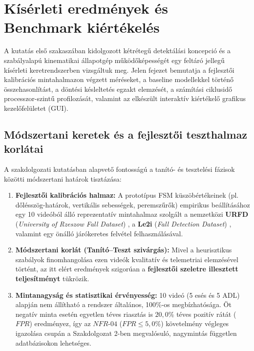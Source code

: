 \documentclass[12pt,a4paper,oneside]{report}
\begin{document}
\chapter{Kísérleti eredmények és Benchmark kiértékelés}

A kutatás első szakaszában kidolgozott kétrétegű detektálási koncepció és a szabályalapú kinematikai állapotgép működőképességét egy feltáró jellegű kísérleti keretrendszerben vizsgáltuk meg. Jelen fejezet bemutatja a fejlesztői kalibrációs mintahalmazon végzett méréseket, a baseline modellekkel történő összehasonlítást, a döntési késleltetés egzakt elemzését, a számítási ciklusidő processzor-szintű profilozását, valamint az elkészült interaktív kiértékelő grafikus kezelőfelületet (GUI).

\section{Módszertani keretek és a fejlesztői teszthalmaz korlátai}
A szakdolgozati kutatásban alapvető fontosságú a tanító- és tesztelési fázisok közötti módszertani határok tisztázása:
\begin{enumerate}
    \item \textbf{Fejlesztői kalibrációs halmaz:} A prototípus FSM küszöbértékeinek (pl. dőlésszög-határok, vertikális sebességek, peremszűrők) empirikus beállításához egy 10 videóból álló reprezentatív mintahalmaz szolgált a nemzetközi \textbf{URFD} (\textit{University of Rzeszow Fall Dataset}) \cite{urfd2014}, a \textbf{Le2i} (\textit{Fall Detection Dataset}) \cite{le2i2013}, valamint egy önálló járókeretes felvétel felhasználásával.
    \item \textbf{Módszertani korlát (Tanító--Teszt szivárgás):} Mivel a heurisztikus szabályok finomhangolása ezen videók kvalitatív és telemetriai elemzésével történt, az itt elért eredmények szigorúan a \textbf{fejlesztői szeletre illesztett teljesítményt} tükrözik.
    \item \textbf{Mintanagyság és statisztikai érvényesség:} 10 videó (5 esés és 5 ADL) alapján nem állítható a rendszer általános, 100\%-os megbízhatósága. Öt negatív minta esetén egyetlen téves riasztás is $20{,}0\%$ téves pozitív rátát ($FPR$) eredményez, így az $NFR\text{-}04$ ($FPR \le 5{,}0\%$) követelmény végleges igazolása csupán a Szakdolgozat 2-ben megvalósuló, nagymintás független adatbázisokon lehetséges.
\end{enumerate}
\end{document}
